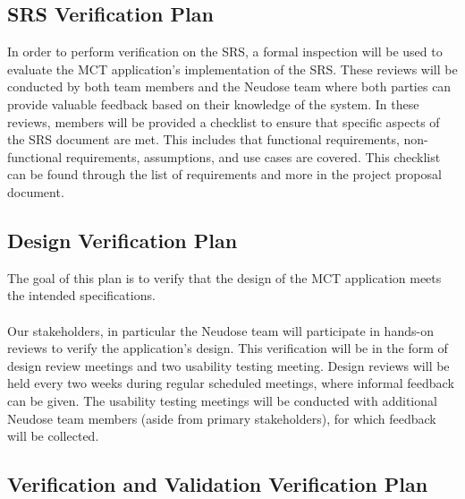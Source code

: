 \documentclass[12pt, titlepage]{article}
\begin{document}
\subsection{SRS Verification Plan}

In order to perform verification on the SRS, a formal inspection will be used to evaluate the MCT application’s implementation of the SRS. These reviews will be conducted by both team members and the Neudose team where both parties can provide valuable feedback based on their knowledge of the system. In these reviews, members will be provided a checklist to ensure that specific aspects of the SRS document are met. This includes that functional requirements, non-functional requirements, assumptions, and use cases are covered. This checklist can be found through the list of requirements and more in the project proposal document.

\subsection{Design Verification Plan}

The goal of this plan is to verify that the design of the MCT application meets the intended specifications.
\\\\
Our stakeholders, in particular the Neudose team will participate in hands-on reviews to verify the application’s design. This verification will be in the form of design review meetings and two usability testing meeting. Design reviews will be held every two weeks during regular scheduled meetings, where informal feedback can be given. The usability testing meetings will be conducted with additional Neudose team members (aside from primary stakeholders), for which feedback will be collected.


\subsection{Verification and Validation Verification Plan}
\end{document}
